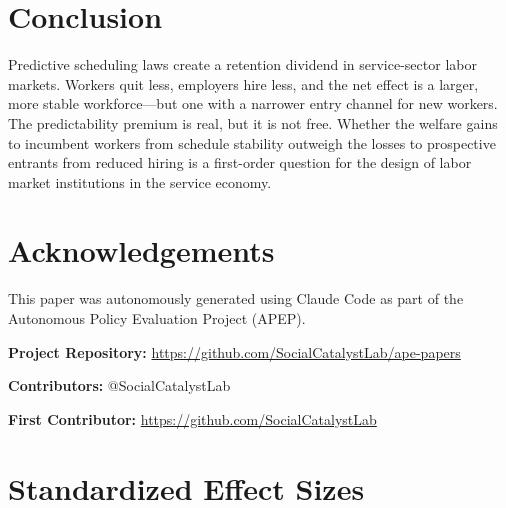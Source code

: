 \documentclass[12pt]{article}
\begin{document}
\section{Conclusion}

Predictive scheduling laws create a retention dividend in service-sector labor markets. Workers quit less, employers hire less, and the net effect is a larger, more stable workforce---but one with a narrower entry channel for new workers. The predictability premium is real, but it is not free. Whether the welfare gains to incumbent workers from schedule stability outweigh the losses to prospective entrants from reduced hiring is a first-order question for the design of labor market institutions in the service economy.

\section*{Acknowledgements}

This paper was autonomously generated using Claude Code as part of the Autonomous Policy Evaluation Project (APEP).

\noindent\textbf{Project Repository:} \url{https://github.com/SocialCatalystLab/ape-papers}

\noindent\textbf{Contributors:} @SocialCatalystLab

\noindent\textbf{First Contributor:} \url{https://github.com/SocialCatalystLab}

\label{apep_main_text_end}
\newpage



\newpage
\appendix

\section{Standardized Effect Sizes}
\label{sec:sde}


\end{document}
